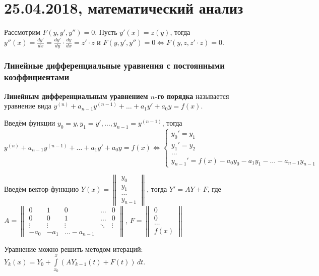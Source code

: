 \chapter{25.04.2018, математический анализ}
Рассмотрим $F(y, y', y'') = 0$.
Пусть $y'(x) = z(y)$, тогда $y''(x) = \frac{dy'}{dx} = \frac{dy'}{dy} \cdot \frac{dy}{dx} = z' \cdot z$ и $F(y, y', y'') = 0 \Leftrightarrow F(y, z, z' \cdot z) = 0$.

\subsection{Линейные дифференциальные уравнения с постоянными коэффициентами}
\textbf{Линейным дифференциальным уравнением $n$-го порядка} называется уравнение вида $y^{(n)} + a_{n-1} y^{(n-1)} + \ldots + a_1 y' + a_0 y = f(x)$.

Введём функции $y_0 = y, y_1 = y', \ldots, y_{n-1} = y^{(n-1)}$, тогда
\begin{equation*}
y^{(n)} + a_{n-1} y^{(n-1)} + \ldots + a_1 y' + a_0 y = f(x) \Leftrightarrow
\begin{cases}
y_0' = y_1 \\
y_1' = y_2 \\
\ldots \\
y_{n-1}' = f(x) - a_0 y_0 - a_1 y_1 - \ldots - a_{n-1} y_{n-1}
\end{cases}
\end{equation*}

Введём вектор-функцию $Y(x) =
\begin{Vmatrix}
y_0 \\
y_1 \\
\ldots \\
y_{n-1}
\end{Vmatrix}$, тогда $Y' = A Y + F$, где $A =
\begin{Vmatrix}
0 & 1 & 0 & \ldots & 0 \\
0 & 0 & 1 & \ldots & 0 \\
\vdots & \vdots & \vdots & \ddots & \vdots \\
-a_0 & -a_1 & \ldots -a_{n-1}
\end{Vmatrix}$, $F =
\begin{Vmatrix}
0 \\
0 \\
\ldots \\
f(x)
\end{Vmatrix}$

Уравнение можно решить методом итераций: $Y_k(x) = Y_0 + \int\limits_{x_0}^x (A Y_{k-1}(t) + F(t))\,dt$.

